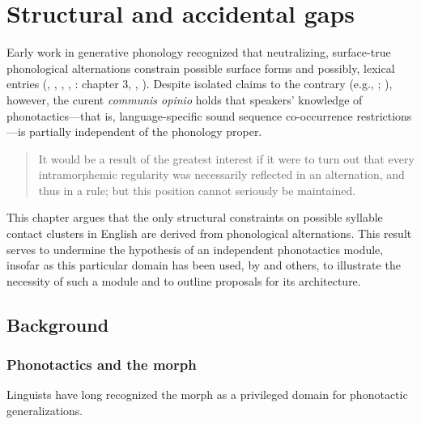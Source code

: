 \chapter{Structural and accidental gaps} \label{clusters}

Early work in generative phonology recognized that neutralizing, surface-true phonological alternations constrain possible surface forms and possibly, lexical entries (\citealp[283]{Anderson1974}, \citealp[382]{SPE}, \citealp[205f.]{Dell1973}, \citealp[22f.]{SPR}, \citealp{Kenstowicz1977}: chapter 3, \citealp[28f.]{Stampe1979}, \citealp[410f.]{Stanley1967}). Despite isolated claims to the contrary (e.g., \citealp[297]{Hale1965}; \citealp[212f.]{Postal1968}), however, the curent \emph{communis opinio} holds that speakers' knowledge of phonotactics---that is, language-specific sound sequence co-occurrence restrictions---is partially independent of the phonology proper. 

\begin{quote}
It would be a result of the greatest interest if it were to turn out that every intramorphemic regularity was necessarily reflected in an alternation, and thus in a rule; but this position cannot seriously be maintained. \citep[283]{Anderson1974}
\end{quote}

This chapter argues that the only structural constraints on possible syllable contact clusters in English are derived from phonological alternations. This result serves to undermine the hypothesis of an independent phonotactics module, insofar as this particular domain has been used, by \citet{Pierrehumbert1994} and others, to illustrate the necessity of such a module and to outline proposals for its architecture.  

\section{Background}

\subsection{Phonotactics and the morph}

Linguists have long recognized the morph as a privileged domain for phonotactic generalizations. 

